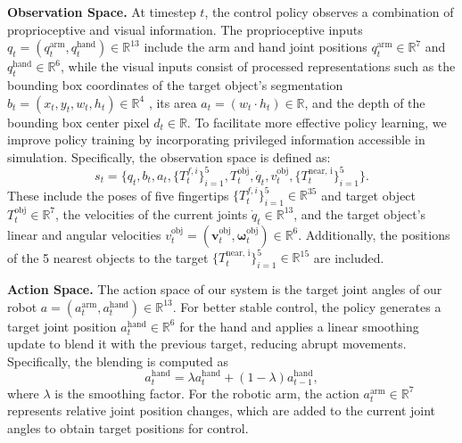\documentclass[10pt, a4paper, logo, twocolumn, copyright]{psibot} %
\begin{document}
\noindent \textbf{Observation Space.} At timestep $t$, the control policy observes a combination of proprioceptive and visual information. The proprioceptive inputs $q_t=(q_t^\textrm{arm}, q_t^\textrm{hand}) \in \mathbb{R}^{13}$ include the arm and hand joint positions $q_t^\textrm{arm} \in \mathbb{R}^7$ and $q_t^\textrm{hand}\in \mathbb{R}^6$, while the visual inputs consist of processed representations such as the bounding box coordinates of the target object's segmentation $b_t = (x_t, y_t, w_t, h_t) \in \mathbb{R}^4$ , its area $a_t = (w_t \cdot h_t) \in \mathbb{R}$, and the depth of the bounding box center pixel $d_t \in \mathbb{R}$. To facilitate more effective policy learning, we improve policy training by incorporating privileged information accessible in simulation. Specifically, the observation space is defined as:
\begin{equation}
s_t= \{q_t, b_t, a_t, \{T_t^{f, i}\}_{i=1}^{5}, T_t^\textrm{obj}, \dot{q}_t, v_t^\textrm{obj}, \{T_t^\textrm{near, i}\}_{i=1}^{5}\}.
\end{equation}
These include the poses of five fingertips $\{T_t^{f, i}\}_{i=1}^{5}\in \mathbb{R}^{35}$ and target object $T_t^\textrm{obj}\in \mathbb{R}^{7}$, the velocities of the current joints $\dot{q}_t\in \mathbb{R}^{13}$, and the target object's linear and angular velocities $v_t^\textrm{obj} = (\mathbf{v}_t^\textrm{obj}, \mathbf{\omega}_t^\textrm{obj})\in \mathbb{R}^{6}$. Additionally, the positions of the 5 nearest objects to the target $\{T_t^\textrm{near, i}\}_{i=1}^{5}\in \mathbb{R}^{15}$ are included.


\noindent \textbf{Action Space.} The action space of our system is the target joint angles of our robot $a=(a_t^\textrm{arm}, a_t^\textrm{hand}) \in \mathbb{R}^{13}$. For better stable control, the policy generates a target joint position $a_t^\textrm{hand}\in \mathbb{R}^{6}$ for the hand and applies a linear smoothing update to blend it with the previous target, reducing abrupt movements. Specifically, the blending is computed as  
\begin{equation}
a_t^\textrm{hand} = \lambda a_t^\textrm{hand} + (1-\lambda) a_{t-1}^\textrm{hand},
\end{equation}
where $\lambda$ is the smoothing factor. For the robotic arm, the action $a_t^\textrm{arm}\in \mathbb{R}^{7}$ represents relative joint position changes, which are added to the current joint angles to obtain target positions for control.
\end{document}
